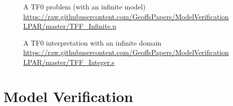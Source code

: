 \documentclass{easychair}
\begin{document}
\begin{figure}[htbp]
\small
{}

\caption{A TF0 problem (with an infinite model)\\
{\footnotesize \url{https://raw.githubusercontent.com/GeoffsPapers/ModelVerificationLPAR/master/TFF_Infinite.p}}}
\label{TF0InfiniteProblem}
\end{figure}

\begin{figure}[htbp]
\small
{}

\caption{A TF0 interpretation with an infinite domain\\
{\footnotesize \url{https://raw.githubusercontent.com/GeoffsPapers/ModelVerificationLPAR/master/TFF_Integer.s}}}
\label{TF0InfiniteInterpretation}
\end{figure}

\section{Model Verification}
\label{Verification}
\end{document}
